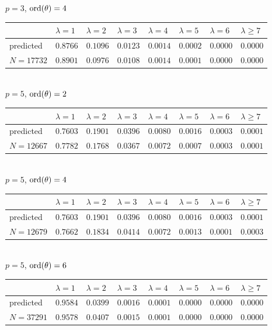 \documentclass[pdflatex,sn-mathphys-num]{sn-jnl}%
\theoremstyle{plain}
\theoremstyle{definition}
\theoremstyle{remark}
\numberwithin{equation}{section}
\newcommand{\ord}{\text{\rm ord}}
\begin{document}
\noindent $p=3$, $\ord(\theta)=4$\\
\begin{tabular}{|l|l|l|l|l|l|l|l|} \hline
& $\lambda=1$ & $\lambda=2$ & $\lambda=3$ & $\lambda=4$ & $\lambda=5$ & $\lambda=6$ & $\lambda\geq 7$ \\ \hline
predicted & $0.8766$ & $0.1096$ & $0.0123$ & $0.0014$ & $0.0002$ & $0.0000$ & $0.0000$ \\ \hline
$N=17732$ & $0.8901$ & $0.0976$ & $0.0108$ & $0.0014$ & $0.0001$ & $0.0000$ & $0.0000$ \\  \hline
\end{tabular}\\


\noindent $p=5$, $\ord(\theta)=2$\\
\begin{tabular}{|l|l|l|l|l|l|l|l|} \hline
& $\lambda=1$ & $\lambda=2$ & $\lambda=3$ & $\lambda=4$ & $\lambda=5$ & $\lambda=6$ & $\lambda\geq 7$ \\ \hline
predicted & $0.7603$ & $0.1901$ & $0.0396$ & $0.0080$ & $0.0016$ & $0.0003$ & $0.0001$\\ \hline
$N=12667$ & $0.7782$ & $0.1768$ & $0.0367$ & $0.0072$ & $0.0007$ & $0.0003$ & $0.0001$  \\  \hline
\end{tabular}\\

\noindent $p=5$, $\ord(\theta)=4$\\
\begin{tabular}{|l|l|l|l|l|l|l|l|} \hline
& $\lambda=1$ & $\lambda=2$ & $\lambda=3$ & $\lambda=4$ & $\lambda=5$ & $\lambda=6$ & $\lambda\geq 7$ \\ \hline
predicted & $0.7603$ & $0.1901$ & $0.0396$ & $0.0080$ & $0.0016$ & $0.0003$ & $0.0001$\\ \hline
$N=12679$ & $0.7662$ & $0.1834$ & $0.0414$ & $0.0072$ & $0.0013$ & $0.0001$ & $0.0003$ \\ \hline
\end{tabular}\\

\noindent $p=5$, $\ord(\theta)=6$\\
\begin{tabular}{|l|l|l|l|l|l|l|l|} \hline
& $\lambda=1$ & $\lambda=2$ & $\lambda=3$ & $\lambda=4$ & $\lambda=5$ & $\lambda=6$ & $\lambda\geq 7$ \\ \hline
predicted & $0.9584$ &  $0.0399$ &  $0.0016$ &  $0.0001$ & $0.0000$ &  $0.0000$ & $0.0000$ \\  \hline
$N=37291$ & $0.9578$ & $0.0407$ & $0.0015$ & $0.0001$ & $0.0000$ & $0.0000$ & $0.0000$ \\ \hline
\end{tabular}\\
\end{document}

